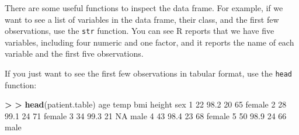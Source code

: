 \documentclass[
]{book}
\newenvironment{Shaded}{\begin{snugshade}}{\end{snugshade}}
\newcommand{\ConstantTok}[1]{\textcolor[rgb]{0.56,0.35,0.01}{#1}}
\newcommand{\DecValTok}[1]{\textcolor[rgb]{0.00,0.00,0.81}{#1}}
\newcommand{\ErrorTok}[1]{\textcolor[rgb]{0.64,0.00,0.00}{\textbf{#1}}}
\newcommand{\FloatTok}[1]{\textcolor[rgb]{0.00,0.00,0.81}{#1}}
\newcommand{\FunctionTok}[1]{\textcolor[rgb]{0.13,0.29,0.53}{\textbf{#1}}}
\newcommand{\NormalTok}[1]{#1}
\newcommand{\SpecialCharTok}[1]{\textcolor[rgb]{0.81,0.36,0.00}{\textbf{#1}}}
\newcommand{\StringTok}[1]{\textcolor[rgb]{0.31,0.60,0.02}{#1}}
\begin{document}
There are some useful functions to inspect the data frame. For example, if we want to see a list of variables in the data frame, their class, and the first few observations, use the \texttt{str} function. You can see R reports that we have five variables, including four numeric and one factor, and it reports the name of each variable and the first five observations.

\begin{Shaded}
\end{Shaded}

If you just want to see the first few observations in tabular format, use the \texttt{head} function:

\begin{Shaded}
\begin{Highlighting}[]
\SpecialCharTok{\textgreater{}} 
\ErrorTok{\textgreater{}} \FunctionTok{head}\NormalTok{(patient.table)}
\NormalTok{  age temp bmi height    sex}
\DecValTok{1}  \DecValTok{22} \FloatTok{98.2}  \DecValTok{20}     \DecValTok{65}\NormalTok{ female}
\DecValTok{2}  \DecValTok{28} \FloatTok{99.1}  \DecValTok{24}     \DecValTok{71}\NormalTok{ female}
\DecValTok{3}  \DecValTok{34} \FloatTok{99.3}  \DecValTok{21}     \ConstantTok{NA}\NormalTok{   male}
\DecValTok{4}  \DecValTok{43} \FloatTok{98.4}  \DecValTok{23}     \DecValTok{68}\NormalTok{ female}
\DecValTok{5}  \DecValTok{50} \FloatTok{98.9}  \DecValTok{24}     \DecValTok{66}\NormalTok{   male}
\end{Highlighting}
\end{Shaded}
\end{document}
